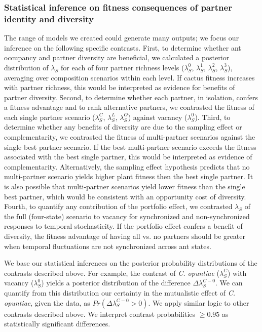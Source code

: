 \documentclass[11pt]{article}
\begin{document}
\subsubsection*{Statistical inference on fitness consequences of partner identity and diversity}
The range of models we created could generate many outputs; we focus our inference on the following specific contrasts. 
First, to determine whether ant occupancy and partner diversity are beneficial, we calculated a posterior distribution of $\lambda_{S}$ for each of four partner richness levels ($\lambda^{0}_{S}$, $\lambda^{1}_{S}$, $\lambda^{2}_{S}$, $\lambda^{3}_{S}$), averaging over composition scenarios within each level. 
If cactus fitness increases with partner richness, this would be interpreted as evidence for benefits of partner diversity. 
Second, to determine whether each partner, in isolation, confers a fitness advantage and to rank alternative partners, we contrasted the fitness of each single partner scenario ($\lambda^{C}_{S}$, $\lambda^{L}_{S}$, $\lambda^{O}_{S}$) against vacancy ($\lambda^{0}_{S}$). 
Third, to determine whether any benefits of diversity are due to the sampling effect or complementarity, we contrasted the fitness of multi-partner scenarios against the single best partner scenario. 
If the best multi-partner scenario exceeds the fitness associated with the best single partner, this would be interpreted as evidence of complementarity. 
Alternatively, the sampling effect hypothesis predicts that no multi-partner scenario yields higher plant fitness then the best single partner. 
It is also possible that multi-partner scenarios yield lower fitness than the single best partner, which would be consistent with an opportunity cost of diversity. 
Fourth, to quantify any contribution of the portfolio effect, we contrasted $\lambda_{S}$ of the full (four-state) scenario to vacancy for synchronized and non-synchronized responses to temporal stochasticity. 
If the portfolio effect confers a benefit of diversity, the fitness advantage of having all vs. no partners should be greater when temporal fluctuations are not synchronized across ant states.

We base our statistical inferences on the posterior probability distributions of the contrasts described above. 
For example, the contrast of \textit{C. opuntiae} ($\lambda^{C}_{S}$) with vacancy ($\lambda^{0}_{S}$) yields a posterior distribution of the difference $\Delta\lambda^{C-0}_{S}$. 
We can quantify from this distribution our certainty in the mutualistic effect of \textit{C. opuntiae}, given the data, as $Pr(\Delta\lambda^{C-0}_{S}>0)$. 
We apply similar logic to other contrasts described above. 
We interpret contrast probabilities $\geq0.95$ as statistically significant differences.
 
\end{document}
